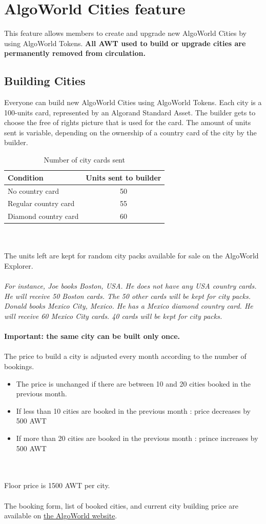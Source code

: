 \documentclass{article}
\begin{document}
\newpage
\section{AlgoWorld Cities feature}
This feature allows members to create and upgrade new AlgoWorld Cities by using AlgoWorld Tokens. \textbf{All AWT used to build or upgrade cities are permanently removed from circulation.} 
\subsection{Building Cities}
Everyone can build new AlgoWorld Cities using AlgoWorld Tokens. Each city is a 100-units card, represented by an Algorand Standard Asset. The builder gets to choose the free of rights picture that is used for the card. 
The amount of units sent is variable, depending on the ownership of a country card of the city by the builder.
\begin{table}[ht]
\centering
\begin{tabular}{l|c}
Condition & Units sent to builder \\\hline
No country card & 50 \\
Regular country card & 55 \\
Diamond country card & 60
\end{tabular}
\caption{\label{tab:widgets}Number of city cards sent}
\end{table}
\\
\\
The units left are kept for random city packs available for sale on the AlgoWorld Explorer.
\\
\\
\textit{For instance, Joe books Boston, USA. He does not have any USA country cards. He will receive 50 Boston cards. The 50 other cards will be kept for city packs. Donald books Mexico City, Mexico. He has a Mexico diamond country card. He will receive 60 Mexico City cards. 40 cards will be kept for city packs.}
\\
\\
\textbf{Important: the same city can be built only once.}
\\
\\
The price to build a city is adjusted every month according to the number of bookings. 

\begin{itemize}
\item The price is unchanged if there are between 10 and 20 cities booked in the previous month.
\item If less than 10 cities are booked in the previous month : price decreases by 500 AWT
\item If more than 20 cities are booked in the previous month : prince increases by 500 AWT
\end{itemize}
\\\\Floor price is 1500 AWT per city.
\\\\The booking form, list of booked cities, and current city building price are available on \href{https://www.algoworld.io/city-booking}{the AlgoWorld website}.
\end{document}
